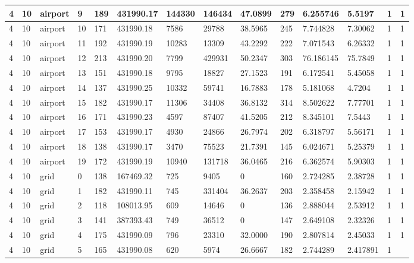 \documentclass[../thesis.tex]{subfiles}
\begin{document}
\begin{table}[!ht]
\begin{tabularx}{\textwidth}{|X|X|X|X|X|X|X|X|X|X|X|X|X|X|}
        4 & 10 & airport & 9 & 189 & 431990.17 & 144330 & 146434 & 47.0899 & 279 & 6.255746 & 5.5197 & 1 & 1 \\ \hline
        4 & 10 & airport & 10 & 171 & 431990.18 & 7586 & 29788 & 38.5965 & 245 & 7.744828 & 7.30062 & 1 & 1 \\ \hline
        4 & 10 & airport & 11 & 192 & 431990.19 & 10283 & 13309 & 43.2292 & 222 & 7.071543 & 6.26332 & 1 & 1 \\ \hline
        4 & 10 & airport & 12 & 213 & 431990.20 & 7799 & 429931 & 50.2347 & 303 & 76.186145 & 75.7849 & 1 & 1 \\ \hline
        4 & 10 & airport & 13 & 151 & 431990.18 & 9795 & 18827 & 27.1523 & 191 & 6.172541 & 5.45058 & 1 & 1 \\ \hline
        4 & 10 & airport & 14 & 137 & 431990.25 & 10332 & 59741 & 16.7883 & 178 & 5.181068 & 4.7204 & 1 & 1 \\ \hline
        4 & 10 & airport & 15 & 182 & 431990.17 & 11306 & 34408 & 36.8132 & 314 & 8.502622 & 7.77701 & 1 & 1 \\ \hline
        4 & 10 & airport & 16 & 171 & 431990.23 & 4597 & 87407 & 41.5205 & 212 & 8.345101 & 7.5443 & 1 & 1 \\ \hline
        4 & 10 & airport & 17 & 153 & 431990.17 & 4930 & 24866 & 26.7974 & 202 & 6.318797 & 5.56171 & 1 & 1 \\ \hline
        4 & 10 & airport & 18 & 138 & 431990.17 & 3470 & 75523 & 21.7391 & 145 & 6.024671 & 5.25379 & 1 & 1 \\ \hline
        4 & 10 & airport & 19 & 172 & 431990.19 & 10940 & 131718 & 36.0465 & 216 & 6.362574 & 5.90303 & 1 & 1 \\ \hline
        4 & 10 & grid & 0 & 138 & 167469.32 & 725 & 9405 & 0 & 160 & 2.724285 & 2.38728 & 1 & 1 \\ \hline
        4 & 10 & grid & 1 & 182 & 431990.11 & 745 & 331404 & 36.2637 & 203 & 2.358458 & 2.15942 & 1 & 1 \\ \hline
        4 & 10 & grid & 2 & 118 & 108013.95 & 609 & 14646 & 0 & 136 & 2.888044 & 2.53912 & 1 & 1 \\ \hline
        4 & 10 & grid & 3 & 141 & 387393.43 & 749 & 36512 & 0 & 147 & 2.649108 & 2.32326 & 1 & 1 \\ \hline
        4 & 10 & grid & 4 & 175 & 431990.09 & 796 & 23310 & 32.0000 & 190 & 2.807814 & 2.45033 & 1 & 1 \\ \hline
        4 & 10 & grid & 5 & 165 & 431990.08 & 620 & 5974 & 26.6667 & 182 & 2.744289 & 2.417891 & 1 & ~ \\ \hline

\end{tabularx}
\end{table}
\end{document}
